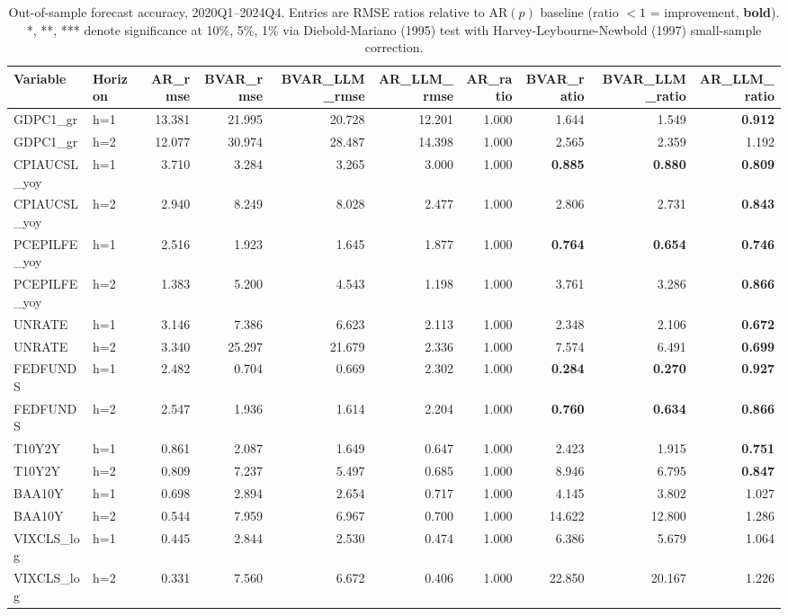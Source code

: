 \begin{table}[htbp]
\centering
\small
\caption{Out-of-sample forecast accuracy, 2020Q1--2024Q4. Entries are RMSE ratios relative to AR$(p)$ baseline (ratio $<1$ = improvement, \textbf{bold}). *, **, *** denote significance at 10\%, 5\%, 1\% via Diebold-Mariano (1995) test with Harvey-Leybourne-Newbold (1997) small-sample correction.}
\label{tab:main_results}
\begin{tabular}{llrrrrrrrr}
\toprule
Variable & Horizon & AR_rmse & BVAR_rmse & BVAR_LLM_rmse & AR_LLM_rmse & AR_ratio & BVAR_ratio & BVAR_LLM_ratio & AR_LLM_ratio \\
\midrule
GDPC1_gr & h=1 & 13.381 & 21.995 & 20.728 & 12.201 & 1.000 & 1.644 & 1.549 & \textbf{0.912} \\
GDPC1_gr & h=2 & 12.077 & 30.974 & 28.487 & 14.398 & 1.000 & 2.565 & 2.359 & 1.192 \\
CPIAUCSL_yoy & h=1 & 3.710 & 3.284 & 3.265 & 3.000 & 1.000 & \textbf{0.885} & \textbf{0.880} & \textbf{0.809} \\
CPIAUCSL_yoy & h=2 & 2.940 & 8.249 & 8.028 & 2.477 & 1.000 & 2.806 & 2.731 & \textbf{0.843} \\
PCEPILFE_yoy & h=1 & 2.516 & 1.923 & 1.645 & 1.877 & 1.000 & \textbf{0.764} & \textbf{0.654} & \textbf{0.746} \\
PCEPILFE_yoy & h=2 & 1.383 & 5.200 & 4.543 & 1.198 & 1.000 & 3.761 & 3.286 & \textbf{0.866} \\
UNRATE & h=1 & 3.146 & 7.386 & 6.623 & 2.113 & 1.000 & 2.348 & 2.106 & \textbf{0.672} \\
UNRATE & h=2 & 3.340 & 25.297 & 21.679 & 2.336 & 1.000 & 7.574 & 6.491 & \textbf{0.699} \\
FEDFUNDS & h=1 & 2.482 & 0.704 & 0.669 & 2.302 & 1.000 & \textbf{0.284} & \textbf{0.270} & \textbf{0.927} \\
FEDFUNDS & h=2 & 2.547 & 1.936 & 1.614 & 2.204 & 1.000 & \textbf{0.760} & \textbf{0.634} & \textbf{0.866} \\
T10Y2Y & h=1 & 0.861 & 2.087 & 1.649 & 0.647 & 1.000 & 2.423 & 1.915 & \textbf{0.751} \\
T10Y2Y & h=2 & 0.809 & 7.237 & 5.497 & 0.685 & 1.000 & 8.946 & 6.795 & \textbf{0.847} \\
BAA10Y & h=1 & 0.698 & 2.894 & 2.654 & 0.717 & 1.000 & 4.145 & 3.802 & 1.027 \\
BAA10Y & h=2 & 0.544 & 7.959 & 6.967 & 0.700 & 1.000 & 14.622 & 12.800 & 1.286 \\
VIXCLS_log & h=1 & 0.445 & 2.844 & 2.530 & 0.474 & 1.000 & 6.386 & 5.679 & 1.064 \\
VIXCLS_log & h=2 & 0.331 & 7.560 & 6.672 & 0.406 & 1.000 & 22.850 & 20.167 & 1.226 \\
\bottomrule
\end{tabular}
\end{table}